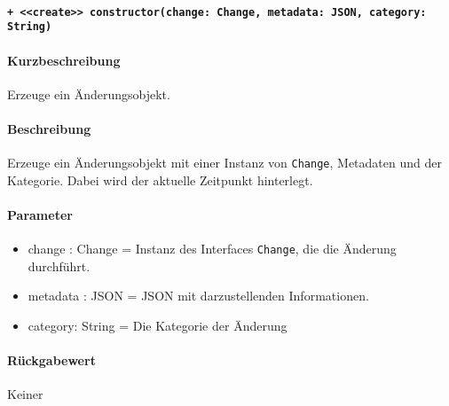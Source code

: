 \paragraph{\texttt{+ <<create>> constructor(change: Change, metadata: JSON, category: String)}}\label{AP_ChangeAction_constructor}%
\paragraph*{Kurzbeschreibung}
Erzeuge ein Änderungsobjekt.
\paragraph*{Beschreibung}
Erzeuge ein Änderungsobjekt mit einer Instanz von \verb#Change#, Metadaten und der Kategorie.
Dabei wird der aktuelle Zeitpunkt hinterlegt.
\paragraph*{Parameter}
\begin{itemize}
    \item change : Change = Instanz des Interfaces \verb#Change#, die die Änderung durchführt.
    \item metadata : JSON = JSON mit darzustellenden Informationen.
    \item category: String = Die Kategorie der Änderung
\end{itemize}
\paragraph*{Rückgabewert}
Keiner